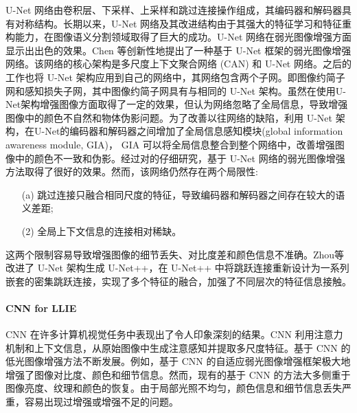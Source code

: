 \documentclass[a4paper, 10pt]{article}
\begin{document}
		U-Net 网络由卷积层、下采样、上采样和跳过连接操作组成，其编码器和解码器具有对称结构。长期以来，U-Net 网络及其改进结构由于其强大的特征学习和特征重构能力，在图像语义分割领域取得了巨大的成功。U-Net 网络在弱光图像增强方面显示出出色的效果。Chen 等\cite{chen2018learning}创新性地提出了一种基于 U-Net 框架的弱光图像增强网络。该网络的核心架构是多尺度上下文聚合网络 (CAN) 和 U-Net 网络。之后的工作\cite{chen2018learning, zamir2021learning}也将 U-Net 架构应用到自己的网络中，其网络包含两个子网。即图像约简子网和感知损失子网，其中图像约简子网具有与\cite{chen2018learning}相同的 U-Net 架构。虽然\cite{chen2018learning, zamir2021learning}在使用U-Net架构增强图像方面取得了一定的效果，但\cite{meng2020gia}认为\cite{chen2018learning, zamir2021learning}网络忽略了全局信息，导致增强图像中的颜色不自然和物体伪影问题。为了改善以往网络的缺陷，利用 U-Net 架构，\cite{meng2020gia}在U-Net的编码器和解码器之间增加了全局信息感知模块(global information awareness module, GIA)， GIA 可以将全局信息整合到整个网络中，改善增强图像中的颜色不一致和伪影。经过对\cite{chen2018learning, meng2020gia, zamir2021learning}的仔细研究，基于 U-Net 网络的弱光图像增强方法取得了很好的效果。然而，该网络仍然存在两个局限性:
		
		\begin{itemize}
			\item[(a)] 
			跳过连接只融合相同尺度的特征，导致编码器和解码器之间存在较大的语义差距;
			
			\item[(2)]
			全局上下文信息的连接相对稀缺。
		\end{itemize}	
		
		这两个限制容易导致增强图像的细节丢失、对比度差和颜色信息不准确。Zhou等\cite{zhou2018unet++,zhou2019unet++}改进了 U-Net 架构生成 U-Net++，在 U-Net++ 中将跳跃连接重新设计为一系列嵌套的密集跳跃连接，实现了多个特征的融合，加强了不同层次的特征信息接触。

		\paragraph{CNN for LLIE}
		
		CNN 在许多计算机视觉任务中表现出了令人印象深刻的结果。CNN 利用注意力机制\cite{yang2021locally, zhang2020attention}和上下文信息，从原始图像中生成注意感知并提取多尺度特征\cite{li2018multi,zamir2020learning}。基于 CNN 的低光图像增强方法不断发展。例如，基于 CNN 的自适应弱光图像增强框架\cite{li2020visual}极大地增强了图像对比度、颜色和细节信息。然而，现有的基于 CNN 的方法大多侧重于图像亮度、纹理和颜色的恢复\cite{xu2020learning}。由于局部光照不均匀，颜色信息和细节信息丢失严重，容易出现过增强或增强不足的问题。
		
\end{document}
